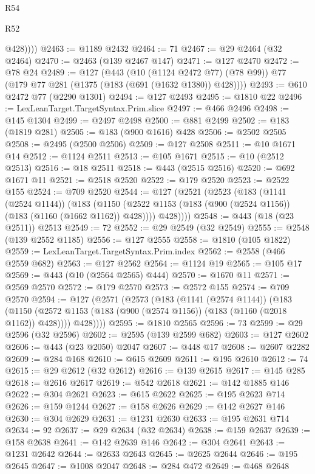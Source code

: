 \begin{lexlean}{R54}
\begin{lexlean}{R52}
\begin{coremodule}
{{{{{{{{{{{{{{{{{{{{{{{{{{{{{{{{{{{{{{{{{{{{{{{{{{{{{{{{{{{{{{{{{{{{{{{{{{{{{{{{{{{{{{{{{{{{{{{{{{{{{{{{{{{{{{{{{{{{{{{{{{{{{{{{{{{{{{{{{{{{{{{{{{{{{{{{{{{{{{{{{{{{{{{{{{{{{{{{{{{{{{{{{{{{{{{{{{{{{{            @428))))
@2463 := @1189 @2432
@2464 := 71
@2467 := @29 @2464 (@32 @2464)
@2470 := @2463 (@139 @2467 @147)
@2471 := @127 @2470
@2472 := @78 @24
@2489 := @127
    (@443
      (@10 (@1124 @2472 @77) (@78 @99))
      @77
      (@179 @77 @281 (@1375 (@183 (@691 (@1632 @1380)) @428))))
@2493 := @610 @2472 @77 (@2290 @1301)
@2494 := @127 @2493
@2495 := @1810 @22
@2496 := LexLeanTarget.TargetSyntax.Prim.slice
@2497 := @466 @2496
@2498 := @145 @1304
@2499 := @2497 @2498
@2500 := @881 @2499
@2502 := @183 (@1819 @281)
@2505 := @183 (@900 @1616) @428
@2506 := @2502 @2505
@2508 := @2495 (@2500 @2506)
@2509 := @127 @2508
@2511 := @10 @1671 @14
@2512 := @1124 @2511
@2513 := @105 @1671
@2515 := @10 (@2512 @2513)
@2516 := @18 @2511
@2518 := @443 (@2515 @2516)
@2520 := @692 @1671 @11
@2521 := @2518 @2520
@2522 := @179 @2520
@2523 := @2522 @155
@2524 := @709 @2520
@2544 := @127
    (@2521
      (@2523
        (@183
          (@1141 (@2524 @1144))
          (@183
            (@1150 (@2522 @1153 (@183 (@900 (@2524 @1156)) (@183 (@1160 (@1662 @1162)) @428))))
            @428))))
@2548 := @443 (@18 (@23 @2511)) @2513
@2549 := 72
@2552 := @29 @2549 (@32 @2549)
@2555 := @2548 (@139 @2552 @1185)
@2556 := @127 @2555
@2558 := @1810 (@105 @1822)
@2559 := LexLeanTarget.TargetSyntax.Prim.index
@2562 := @2558 (@466 @2559 @682)
@2563 := @127 @2562
@2564 := @1124 @19
@2565 := @105 @17
@2569 := @443 (@10 (@2564 @2565) @444)
@2570 := @1670 @11
@2571 := @2569 @2570
@2572 := @179 @2570
@2573 := @2572 @155
@2574 := @709 @2570
@2594 := @127
    (@2571
      (@2573
        (@183
          (@1141 (@2574 @1144))
          (@183
            (@1150 (@2572 @1153 (@183 (@900 (@2574 @1156)) (@183 (@1160 (@2018 @1162)) @428))))
            @428))))
@2595 := @1810 @2565
@2596 := 73
@2599 := @29 @2596 (@32 @2596)
@2602 := @2595 (@139 @2599 @682)
@2603 := @127 @2602
@2606 := @443 (@23 @2050) @2047
@2607 := @448 @17
@2608 := @2607 @2282
@2609 := @284 @168
@2610 := @615 @2609
@2611 := @195 @2610
@2612 := 74
@2615 := @29 @2612 (@32 @2612)
@2616 := @139 @2615
@2617 := @145 @285
@2618 := @2616 @2617
@2619 := @542 @2618
@2621 := @142 @1885 @146
@2622 := @304 @2621
@2623 := @615 @2622
@2625 := @195 @2623 @714
@2626 := @159 @1244
@2627 := @158 @2626
@2629 := @142 @2627 @146
@2630 := @304 @2629
@2631 := @1231 @2630
@2633 := @195 @2631 @714
@2634 := 92
@2637 := @29 @2634 (@32 @2634)
@2638 := @159 @2637
@2639 := @158 @2638
@2641 := @142 @2639 @146
@2642 := @304 @2641
@2643 := @1231 @2642
@2644 := @2633 @2643
@2645 := @2625 @2644
@2646 := @195 @2645
@2647 := @1008 @2047
@2648 := @284 @472
@2649 := @468 @2648
}}}}}}}}}}}}}}}}}}}}}}}}}}}}}}}}}}}}}}}}}}}}}}}}}}}}}}}}}}}}}}}}}}}}}}}}}}}}}}}}}}}}}}}}}}}}}}}}}}}}}}}}}}}}}}}}}}}}}}}}}}}}}}}}}}}}}}}}}}}}}}}}}}}}}}}}}}}}}}}}}}}}}}}}}}}}}}}}}}}}}}}}}}}}}}}}}}}}}}
\end{coremodule}
\end{lexlean}
\end{lexlean}
